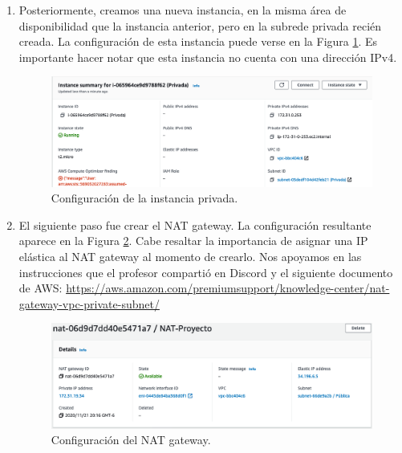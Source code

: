 \documentclass{article}
\begin{document}
\begin{enumerate}
  \item Posteriormente, creamos una nueva instancia,
    en la misma \'area de disponibilidad que la instancia
    anterior, pero en la subrede privada reci\'en creada.
    La configuraci\'on de esta instancia puede verse en
    la Figura \ref{fig:NAT-priInstance}.   Es importante hacer
    notar que esta instancia no cuenta con una direcci\'on
    IPv4.
    \begin{figure}[H]
      \centering
      \includegraphics[width=\textwidth]{SSNAT/privateInstance}
      \caption{Configuraci\'on de la instancia privada.}
      \label{fig:NAT-priInstance}
    \end{figure}

  \item El siguiente paso fue crear el NAT gateway.   La
    configuraci\'on resultante aparece en la Figura
    \ref{fig:NAT-nat}.  Cabe resaltar la importancia de
    asignar una IP el\'astica al NAT gateway al momento
    de crearlo. Nos apoyamos en las instrucciones que el
    profesor comparti\'o en Discord y el siguiente
    documento de AWS:
    \href{https://aws.amazon.com/premiumsupport/knowledge-center/nat-gateway-vpc-private-subnet/}{https://aws.amazon.com/premiumsupport/knowledge-center/nat-gateway-vpc-private-subnet/}
    \begin{figure}[H]
      \centering
      \includegraphics[width=\textwidth]{SSNAT/nat}
      \caption{Configuraci\'on del NAT gateway.}
      \label{fig:NAT-nat}
    \end{figure}


\end{enumerate}
\end{document}
